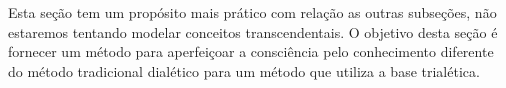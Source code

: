 \documentclass[10pt,a4paper]{report}
\begin{document}
Esta seção tem um propósito mais prático com relação as outras subseções, não estaremos tentando modelar conceitos transcendentais. O objetivo desta seção é fornecer um método para aperfeiçoar a consciência pelo conhecimento diferente do método tradicional dialético para um método que utiliza a base trialética.





\end{document}
